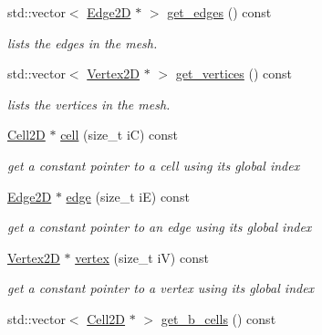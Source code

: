 \begin{DoxyCompactItemize}
std\+::vector$<$ \hyperlink{classHCore2D_1_1Edge2D}{Edge2D} $\ast$ $>$ \hyperlink{group__Mesh2D_gaee836ab97bedaf3bfa74a8cc27c5ac04}{get\+\_\+edges} () const
\begin{DoxyCompactList}\small\item\em lists the edges in the mesh. \end{DoxyCompactList}\item 
std\+::vector$<$ \hyperlink{classHCore2D_1_1Vertex2D}{Vertex2D} $\ast$ $>$ \hyperlink{group__Mesh2D_ga71cf2e0944030e917392587697c2f01f}{get\+\_\+vertices} () const
\begin{DoxyCompactList}\small\item\em lists the vertices in the mesh. \end{DoxyCompactList}\item 
\mbox{\label{classHCore2D_1_1Mesh2D_a1d8c40ea85f0abe3ae5aea23e4a95583}} 
\hyperlink{classHCore2D_1_1Cell2D}{Cell2D} $\ast$ \hyperlink{classHCore2D_1_1Mesh2D_a1d8c40ea85f0abe3ae5aea23e4a95583}{cell} (size\+\_\+t iC) const
\begin{DoxyCompactList}\small\item\em get a constant pointer to a cell using its global index \end{DoxyCompactList}\item 
\mbox{\label{classHCore2D_1_1Mesh2D_a9dd54d7b118e6f645d9af819a7555e93}} 
\hyperlink{classHCore2D_1_1Edge2D}{Edge2D} $\ast$ \hyperlink{classHCore2D_1_1Mesh2D_a9dd54d7b118e6f645d9af819a7555e93}{edge} (size\+\_\+t iE) const
\begin{DoxyCompactList}\small\item\em get a constant pointer to an edge using its global index \end{DoxyCompactList}\item 
\mbox{\label{classHCore2D_1_1Mesh2D_ac29a7c5c0c36b3aa519520fbb9cf20de}} 
\hyperlink{classHCore2D_1_1Vertex2D}{Vertex2D} $\ast$ \hyperlink{classHCore2D_1_1Mesh2D_ac29a7c5c0c36b3aa519520fbb9cf20de}{vertex} (size\+\_\+t iV) const
\begin{DoxyCompactList}\small\item\em get a constant pointer to a vertex using its global index \end{DoxyCompactList}\item 
std\+::vector$<$ \hyperlink{classHCore2D_1_1Cell2D}{Cell2D} $\ast$ $>$ \hyperlink{group__Mesh2D_gab43135dfb235a0f8ee1b4352e79a6fe4}{get\+\_\+b\+\_\+cells} () const

\end{DoxyCompactItemize}
